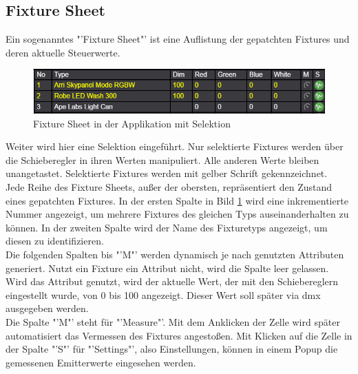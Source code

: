 \documentclass[11pt]{scrartcl}
\begin{document}
\subsection{Fixture Sheet}
Ein sogenanntes "'Fixture Sheet"' ist eine Auflistung der gepatchten Fixtures und deren aktuelle Steuerwerte.
\begin{figure}[H]
    \begin{center}
        \includegraphics[width=.9\textwidth]{images/app_fixture_sheet_dummy.png}
    \end{center}
    \vspace{-10pt}
    \caption{Fixture Sheet in der Applikation mit Selektion}\label{fig:fixtureSheet}
\end{figure}
\noindent
Weiter wird hier eine Selektion eingeführt. Nur selektierte Fixtures werden über die Schieberegler in ihren Werten manipuliert. Alle anderen Werte bleiben
unangetastet. Selektierte Fixtures werden mit gelber Schrift gekennzeichnet.\\
Jede Reihe des Fixture Sheets, außer der obersten, repräsentiert den Zustand eines gepatchten Fixtures. In der ersten Spalte in Bild \ref{fig:fixtureSheet}
wird eine inkrementierte Nummer angezeigt, um mehrere Fixtures des gleichen Typs auseinanderhalten zu können. In der zweiten Spalte wird der Name des
Fixturetyps angezeigt, um diesen zu identifizieren.\\
Die folgenden Spalten bis "'M"' werden dynamisch je nach genutzten Attributen generiert. Nutzt ein Fixture ein Attribut nicht, wird die Spalte leer gelassen.
Wird das Attribut genutzt, wird der aktuelle Wert, der mit den Schiebereglern eingestellt wurde, von 0 bis 100 angezeigt. Dieser Wert soll später via \ac{dmx}
ausgegeben werden.\\
Die Spalte "'M"' steht für "'Measure"'. Mit dem Anklicken der Zelle wird später automatisiert das Vermessen des Fixtures angestoßen. Mit Klicken auf die
Zelle in der Spalte "'S"' für "'Settings"', also Einstellungen, können in einem Popup die gemessenen Emitterwerte eingesehen werden.
\end{document}

